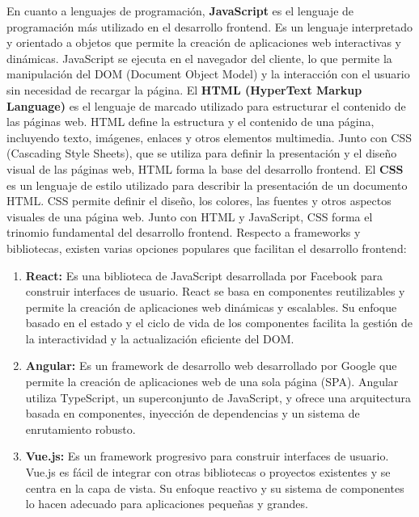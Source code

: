 En cuanto a lenguajes de programación, \textbf{JavaScript}\cite{javascript} es el lenguaje de programación más utilizado en el desarrollo frontend. Es un lenguaje interpretado y orientado a objetos que permite la creación de aplicaciones web interactivas y dinámicas. JavaScript se ejecuta en el navegador del cliente, lo que permite la manipulación del DOM (Document Object Model) y la interacción con el usuario sin necesidad de recargar la página.
\newline\newline
El \textbf{HTML (HyperText Markup Language)}\cite{html} es el lenguaje de marcado utilizado para estructurar el contenido de las páginas web. HTML define la estructura y el contenido de una página, incluyendo texto, imágenes, enlaces y otros elementos multimedia. Junto con CSS (Cascading Style Sheets), que se utiliza para definir la presentación y el diseño visual de las páginas web, HTML forma la base del desarrollo frontend.
\newline\newline
El \textbf{CSS}\cite{css} es un lenguaje de estilo utilizado para describir la presentación de un documento HTML. CSS permite definir el diseño, los colores, las fuentes y otros aspectos visuales de una página web. Junto con HTML y JavaScript, CSS forma el trinomio fundamental del desarrollo frontend.
\newline\newline
Respecto a frameworks y bibliotecas, existen varias opciones populares que facilitan el desarrollo frontend:   

\begin{enumerate}
    \item \textbf{React\cite{react}:} Es una biblioteca de JavaScript desarrollada por Facebook para construir interfaces de usuario. React se basa en componentes reutilizables y permite la creación de aplicaciones web dinámicas y escalables. Su enfoque basado en el estado y el ciclo de vida de los componentes facilita la gestión de la interactividad y la actualización eficiente del DOM.
    \item \textbf{Angular\cite{angular}:} Es un framework de desarrollo web desarrollado por Google que permite la creación de aplicaciones web de una sola página (SPA). Angular utiliza TypeScript, un superconjunto de JavaScript, y ofrece una arquitectura basada en componentes, inyección de dependencias y un sistema de enrutamiento robusto.
    \item \textbf{Vue.js\cite{vuejs}:} Es un framework progresivo para construir interfaces de usuario. Vue.js es fácil de integrar con otras bibliotecas o proyectos existentes y se centra en la capa de vista. Su enfoque reactivo y su sistema de componentes lo hacen adecuado para aplicaciones pequeñas y grandes.
\end{enumerate}

